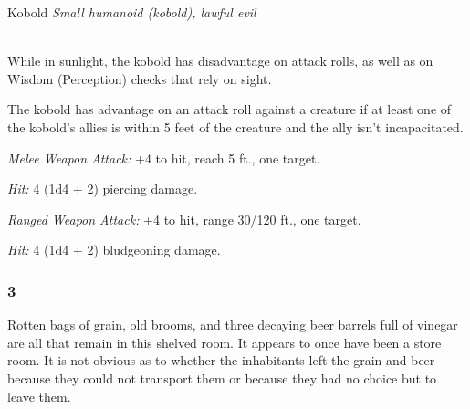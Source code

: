 \documentclass[palace_of_the_silver_princess]{subfiles}
\begin{document}
\begin{monsterbox}{Kobold}
    \textit{Small humanoid (kobold), lawful evil}\\
    \hline
    \basics[%
        armorclass = 12,
        hitpoints  = 5 (2d6 - 2),
        speed      = 30 ft.
    ]
    \hline
    \stats[
        STR = \stat{7},
        DEX = \stat{15},
        CON = \stat{9},
        INT = \stat{8},
        WIS = \stat{7},
        CHA = \stat{8}
    ]
    \hline
    \details[
        senses = {darkvision 60 ft., passive Perception 8},
        languages = {Common, Draconic},
        challenge = {1/8 (25 XP)},
    ]
    \hline
    \\[1mm]
    \begin{monsteraction}
        While in sunlight, the kobold has disadvantage on attack rolls,
        as well as on Wisdom (Perception) checks that rely on sight.
    \end{monsteraction}

    \begin{monsteraction}
        The kobold has advantage on an attack roll against a creature
        if at least one of the kobold's allies is within 5 feet of the
        creature and the ally isn't incapacitated.
    \end{monsteraction}
     \begin{monsteraction}[Dagger]
         \textit{Melee Weapon Attack:} +4 to hit, reach 5 ft., one target.

         \textit{Hit:} 4 (1d4 + 2) piercing damage.
     \end{monsteraction}

     \begin{monsteraction}[Sling]
         \textit{Ranged Weapon Attack:} +4 to hit, range 30/120 ft.,
         one target. 

         \textit{Hit:} 4 (1d4 + 2) bludgeoning damage.
     \end{monsteraction}
\end{monsterbox}

\subsubsection{3}

\begin{quotebox}
    Rotten bags of grain, old brooms, and three decaying beer barrels
    full of vinegar are all that remain in this shelved room. It appears
    to once have been a store room. It is not obvious as to whether the
    inhabitants left the grain and beer because they could not transport
    them or because they had no choice but to leave them.
\end{quotebox}
\end{document}
